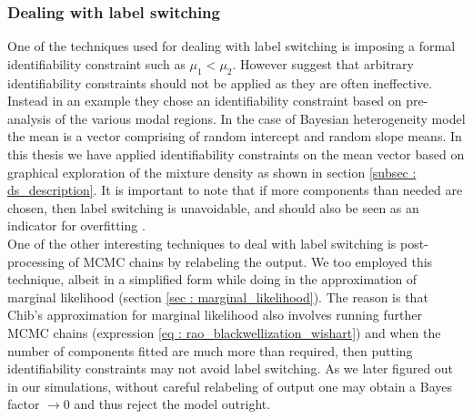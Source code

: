 \subsubsection{Dealing with label switching}
One of the techniques used for dealing with label switching is imposing a formal identifiability constraint such as $\mu_1 < \mu_2$. However \citet{fruhwirth-schnatter_bayesian_2004} suggest that arbitrary identifiability constraints should not be applied as they are often ineffective. Instead in an example they chose an identifiability constraint based on pre-analysis of the various modal regions. In the case of Bayesian heterogeneity model the mean is a vector comprising of random intercept and random slope means. In this thesis we have applied identifiability constraints on the mean vector based on graphical exploration of the mixture density as shown in section \ref{subsec : ds_description}. It is important to note that if more components than needed are chosen, then label switching is unavoidable, and should also be seen as an indicator for overfitting \citep[pg. 104]{fruhwirth-schnatter_finite_2013}.\\

One of the other interesting techniques to deal with label switching is post-processing of MCMC chains by relabeling the output\citep{richardson_bayesian_1997,stephens_dealing_2000}. We too employed this technique, albeit in a simplified form while doing in the approximation of marginal likelihood (section \ref{sec : marginal_likelihood}). The reason is that Chib's approximation for marginal likelihood also involves running further MCMC chains (expression \ref{eq : rao_blackwellization_wishart}) and when the number of components fitted are much more than required, then putting identifiability constraints may not avoid label switching. As we later figured out in our simulations, without careful relabeling of output one may obtain a Bayes factor $\to 0$ and thus reject the model outright.